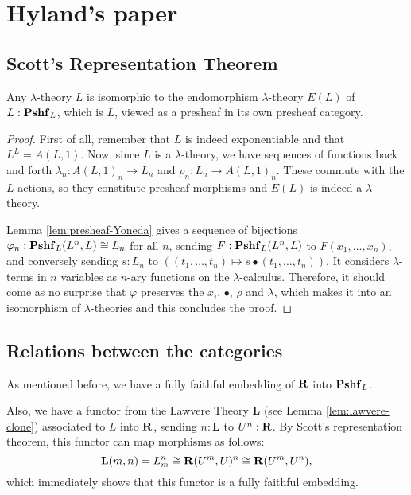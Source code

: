 \chapter{Hyland's paper}


\section{Scott's Representation Theorem}
\begin{theorem}
  Any $ \lambda $-theory $ L $ is isomorphic to the endomorphism $ \lambda $-theory $ E(L) $ of $ L: \mathbf{Pshf}_{L} $, which is $ L $, viewed as a presheaf in its own presheaf category.
\end{theorem}
\begin{proof}
  First of all, remember that $ L $ is indeed exponentiable and that $ L^L = A(L, 1) $.
  Now, since $ L $ is a $ \lambda $-theory, we have sequences of functions back and forth $ \lambda_n: A(L, 1)_n \to L_n $ and $ \rho_n: L_n \to A(L, 1)_n $. These commute with the $ L $-actions, so they constitute presheaf morphisms and $ E(L) $ is indeed a $ \lambda $-theory.

  Lemma \ref{lem:presheaf-Yoneda} gives a sequence of bijections $ \varphi_n : \mathbf{Pshf}_{L}(L^n, L) \cong L_n $ for all $ n $, sending $ F: \mathbf{Pshf}_{L}(L^n, L) $ to $ F(x_1, \dots, x_n) $, and conversely sending $ s: L_n $ to $ ((t_1, \dots, t_n) \mapsto s \bullet (t_1, \dots, t_n)) $. It considers $ \lambda $-terms in $ n $ variables as $ n $-ary functions on the $ \lambda $-calculus. Therefore, it should come as no surprise that $ \varphi $ preserves the $ x_i $, $ \bullet $, $ \rho $ and $ \lambda $, which makes it into an isomorphism of $ \lambda $-theories and this concludes the proof.
\end{proof}

\section{Relations between the categories}

As mentioned before, we have a fully faithful embedding of $ \mathbf{R} $ into $ \mathbf{Pshf}_{L} $.

Also, we have a functor from the Lawvere Theory $ \mathbf{L} $ (see Lemma \ref{lem:lawvere-clone}) associated to $ L $ into $ \mathbf{R} $, sending $ n : \mathbf L $ to $ U^n : \mathbf{R} $. By Scott's representation theorem, this functor can map morphisms as follows:
\[ \mathbf L(m, n) = L_m^n \cong \mathbf{R}(U^m, U)^n \cong \mathbf{R}(U^m, U^n), \]
which immediately shows that this functor is a fully faithful embedding.


